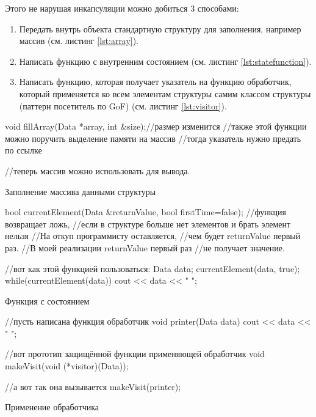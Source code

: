 \documentclass[12pt]{article}
\begin{document}
Этого не нарушая инкапсуляции можно добиться 3 способами:
\begin{enumerate}
 \item Передать внутрь объекта стандартную структуру для заполнения, например массив (см. листинг \ref{lst:array}).
 \item Написать функцию с внутренним состоянием (см. листинг \ref{lst:statefunction}).
 \item Написать функцию, которая получает указатель на функцию обработчик, который применяется ко всем элементам 
структуры самим классом структуры (паттерн посетитель по GoF) (см. листинг \ref{lst:visitor}).
\end{enumerate}
\begin{listing}[H]
\begin{center}
\begin{cppcode}
void fillArray(Data *array, int &size);//размер изменится
//также этой функции можно поручить выделение памяти на массив
//тогда  указатель нужно предать по ссылке

//теперь массив можно использовать для вывода.
\end{cppcode}
\end{center}
\caption{Заполнение массива данными структуры}
\label{lst:array}
\end{listing}

\begin{listing}[H]
\begin{center}
\begin{cppcode}
bool currentElement(Data &returnValue, bool firstTime=false);
//функция возвращает ложь,
//если в структуре больше нет элементов и брать элемент нельзя
//На откуп программисту оставляется, 
//чем будет returnValue первый раз.
//В моей реализации returnValue первый раз
//не получает значение.


//вот как этой функцией пользоваться:
Data data;
currentElement(data, true);
while(currentElement(data))
{
    cout << data << " ";
}
\end{cppcode}
\end{center}
\caption{Функция с состоянием}
\label{lst:statefunction}
\end{listing}

\begin{listing}[H]
\begin{center}
\begin{cppcode}
//пусть написана функция обработчик
void printer(Data data)
{
    cout << data << " ";
}

//вот прототип защищённой функции применяющей обработчик
void makeVisit(void (*visitor)(Data));

//а вот так она вызывается
makeVisit(printer);
\end{cppcode}
\end{center}
\caption{Применение обработчика}
\label{lst:visitor}
\end{listing}
\end{document}
